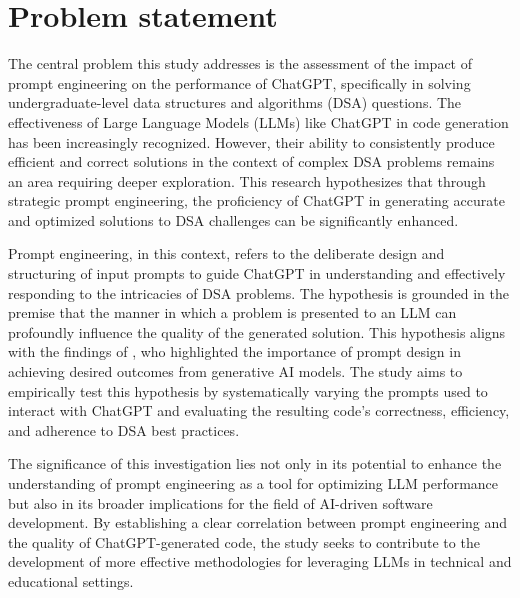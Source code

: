 \section{Problem statement}
\label{sec:intro_prob_art}
The central problem this study addresses is the assessment of the impact of prompt engineering on the performance of ChatGPT, specifically in solving undergraduate-level data structures and algorithms (DSA) questions. The effectiveness of Large Language Models (LLMs) like ChatGPT in code generation has been increasingly recognized. However, their ability to consistently produce efficient and correct solutions in the context of complex DSA problems remains an area requiring deeper exploration. This research hypothesizes that through strategic prompt engineering, the proficiency of ChatGPT in generating accurate and optimized solutions to DSA challenges can be significantly enhanced.

Prompt engineering, in this context, refers to the deliberate design and structuring of input prompts to guide ChatGPT in understanding and effectively responding to the intricacies of DSA problems. The hypothesis is grounded in the premise that the manner in which a problem is presented to an LLM can profoundly influence the quality of the generated solution. This hypothesis aligns with the findings of \cite{radford2019language}, who highlighted the importance of prompt design in achieving desired outcomes from generative AI models. The study aims to empirically test this hypothesis by systematically varying the prompts used to interact with ChatGPT and evaluating the resulting code's correctness, efficiency, and adherence to DSA best practices.

The significance of this investigation lies not only in its potential to enhance the understanding of prompt engineering as a tool for optimizing LLM performance but also in its broader implications for the field of AI-driven software development. By establishing a clear correlation between prompt engineering and the quality of ChatGPT-generated code, the study seeks to contribute to the development of more effective methodologies for leveraging LLMs in technical and educational settings.



